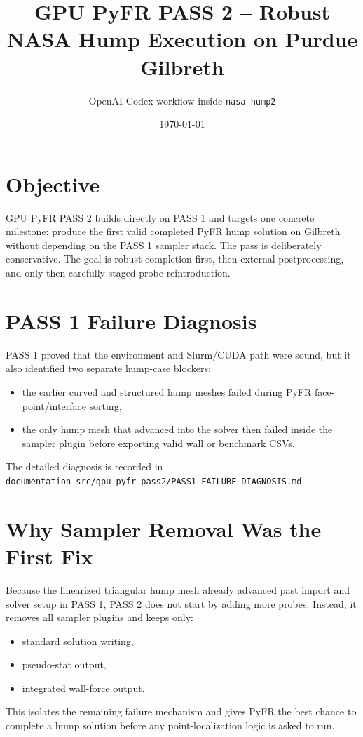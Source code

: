 \documentclass[11pt]{article}
\title{GPU PyFR PASS 2 -- Robust NASA Hump Execution on Purdue Gilbreth}
\author{OpenAI Codex workflow inside \texttt{nasa-hump2}}
\date{\today}
\begin{document}
\maketitle

\section{Objective}
GPU PyFR PASS 2 builds directly on PASS 1 and targets one concrete milestone: produce the first valid completed PyFR hump solution on Gilbreth without depending on the PASS 1 sampler stack. The pass is deliberately conservative. The goal is robust completion first, then external postprocessing, and only then carefully staged probe reintroduction.

\section{PASS 1 Failure Diagnosis}
PASS 1 proved that the environment and Slurm/CUDA path were sound, but it also identified two separate hump-case blockers:
\begin{itemize}
  \item the earlier curved and structured hump meshes failed during PyFR face-point/interface sorting,
  \item the only hump mesh that advanced into the solver then failed inside the sampler plugin before exporting valid wall or benchmark CSVs.
\end{itemize}
The detailed diagnosis is recorded in \texttt{documentation\_src/gpu\_pyfr\_pass2/PASS1\_FAILURE\_DIAGNOSIS.md}.

\section{Why Sampler Removal Was the First Fix}
Because the linearized triangular hump mesh already advanced past import and solver setup in PASS 1, PASS 2 does not start by adding more probes. Instead, it removes all sampler plugins and keeps only:
\begin{itemize}
  \item standard solution writing,
  \item pseudo-stat output,
  \item integrated wall-force output.
\end{itemize}
This isolates the remaining failure mechanism and gives PyFR the best chance to complete a hump solution before any point-localization logic is asked to run.
\end{document}
